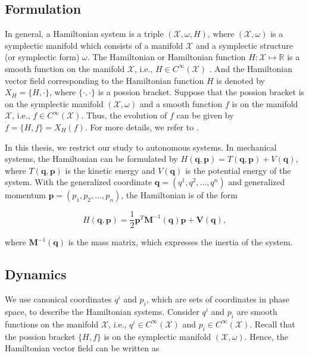 \documentclass[
	parskip, 			   %
	twoside, 			   %
	DIV=14, 			   %
	BCOR=15.0mm, 		   %
	headsepline, 		   %
	open=right, 		   %
	captions=tableheading, %
	bibliography=totoc,    %
	numbers=noenddot       %
]{scrreprt}
\begin{document}
\subsection{Formulation}
In general, a Hamiltonian system is a triple $(\mathcal{X},\omega,H)$, where $(\mathcal{X},\omega)$ is a symplectic manifold which consists of a manifold $\mathcal{X}$ and a symplectic structure (or symplectic form) $\omega$. The Hamiltonian or Hamiltonian function $H: \mathcal{X} \mapsto \mathbb{R} $ is a smooth function on the manifold $\mathcal{X}$, i.e., $H \in C^{\infty}(\mathcal{X})$ \cite{rudolph2017differential}. And the Hamiltonian vector field corresponding to the Hamiltonian function $H$ is denoted by $X_H = \{H, \cdot \}$, where $\{\cdot, \cdot\}$ is a possion bracket. Suppose that the possion bracket is on the symplectic manifold $(\mathcal{X},\omega)$ and a smooth function $f$ is on the manifold $\mathcal{X}$, i.e., $f \in C^{\infty}(\mathcal{X}) $. Thus, the evolution of $f$ can be given by $\dot{f} = \{H, f\} = X_H(f)$. For more details, we refer to \cite{rudolph2012differential}.

In this thesis, we restrict our study to autonomous systems. In mechanical systems, the Hamiltonian can be formulated by $H(\mathbf{q},\mathbf{p})=T(\mathbf{q},\mathbf{p})+V(\mathbf{q})$, where $T(\mathbf{q},\mathbf{p})$ is the kinetic energy and $V(\mathbf{q})$ is the potential energy of the system. With the generalized coordinate $\mathbf{q} = (q^1, q^2, ..., q^n)$ and generalized momentum $\mathbf{p} = (p_1, p_2, ..., p_n)$, the Hamiltonian is of the form

\begin{equation}
    \label{eq:Hamiltonian}
    H(\mathbf{q},\mathbf{p})=\frac{1}{2}\mathbf{p}^T\mathbf{M}^{-1}(\mathbf{q})\mathbf{p} + \mathbf{V}(\mathbf{q}),
\end{equation}

where $\mathbf{M}^{-1}(\mathbf{q})$ is the mass matrix, which expresses the inertia of the system.

\subsection{Dynamics}
We use canonical coordinates $q^i$ and $p_i$, which are sets of coordinates in phase space, to describe the Hamiltonian systems. Consider $q^i$ and $p_i$ are smooth functions on the manifold $\mathcal{X}$, i.e., $q^i \in C^{\infty}(\mathcal{X})$ and $p_i \in C^{\infty}(\mathcal{X})$. Recall that the possion bracket $\{H, f\}$ is on the symplectic manifold $(\mathcal{X},\omega)$. Hence, the Hamiltonian vector field can be written as 
\end{document}
